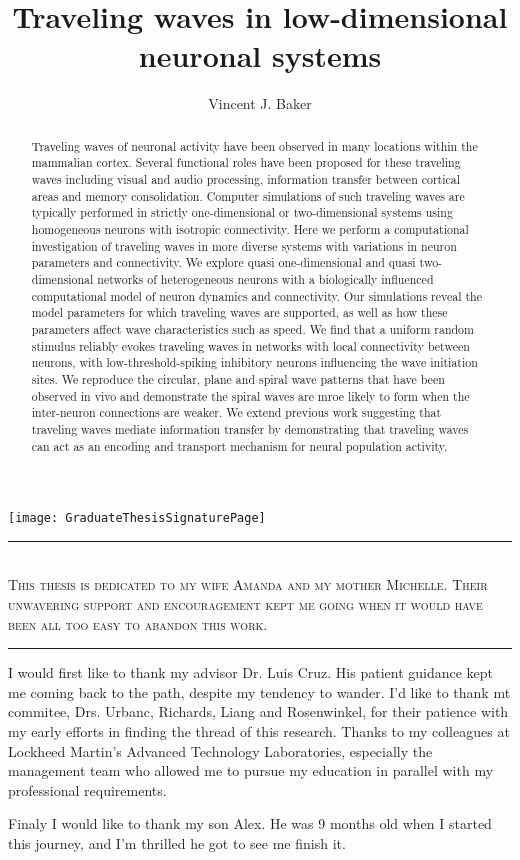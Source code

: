 \documentclass[subfig,blackref]{drexel-thesis}
\author{Vincent J. Baker}
\title{Traveling waves in low-dimensional neuronal systems}
\begin{document}
\texttt{[image: GraduateThesisSignaturePage]}

\begin{DUTpreamble} %

\begin{dedications}
\rule{\textwidth}{1pt}
\\
\centering
\textsc{This thesis is dedicated to my wife Amanda and my mother Michelle.
Their unwavering support and encouragement kept me going when it would have been all too easy to abandon this work.}
\\
\rule{\textwidth}{1pt}
\end{dedications}


\begin{acknowledgments}
I would first like to thank my advisor Dr. Luis Cruz. 
His patient guidance kept me coming back to the path, despite my tendency to wander.
I'd like to thank mt commitee,  Drs. Urbanc, Richards, Liang and Rosenwinkel, for their patience with my early efforts in finding the thread of this research.
Thanks to my colleagues at Lockheed Martin's Advanced Technology Laboratories, especially the management team who allowed me to pursue my education in parallel with my professional requirements.

Finaly I would like to thank my son Alex. 
He was 9 months old when I started this journey, and I'm thrilled he got to see me finish it.
\end{acknowledgments}

\tableofcontents
\listoftables
\listoffigures

\begin{abstract}
Traveling waves of neuronal activity have been observed in many locations within the mammalian cortex.
Several functional roles have been proposed for these traveling waves including visual and audio processing, information transfer between cortical areas and memory consolidation.
Computer simulations of such traveling waves are typically performed in strictly one-dimensional or two-dimensional systems using homogeneous neurons with isotropic connectivity. 
Here we perform a computational investigation of traveling waves in more diverse systems with variations in neuron parameters and connectivity.
We explore quasi one-dimensional and quasi two-dimensional networks of heterogeneous neurons with a biologically influenced computational model of neuron dynamics and connectivity.
Our simulations reveal the model parameters for which traveling waves are supported, as well as how these parameters affect wave characteristics such as speed.
We find that a uniform random stimulus reliably evokes traveling waves in networks with local connectivity between neurons, with low-threshold-spiking inhibitory neurons influencing the wave initiation sites.
We reproduce the circular, plane and spiral wave patterns that have been observed in vivo and demonstrate the spiral waves are mroe likely to form when the inter-neuron connections are weaker.
We extend previous work suggesting that traveling waves mediate information transfer by demonstrating that traveling waves can act as an encoding and transport mechanism for neural population activity.


\end{abstract}
\end{DUTpreamble}
\end{document}
